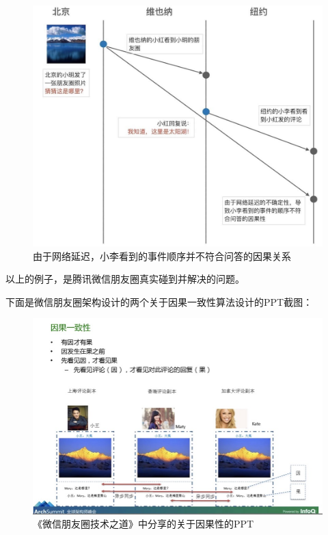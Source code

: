 \documentclass[cn,11pt,chinese]{elegantbook}
\begin{document}
\begin{figure}
\centering
\includegraphics{images/appendix-a-02.jpeg}
\caption{由于网络延迟，小李看到的事件顺序并不符合问答的因果关系}
\end{figure}

以上的例子，是腾讯微信朋友圈真实碰到并解决的问题。

下面是微信朋友圈架构设计的两个关于因果一致性算法设计的PPT截图：

\begin{figure}
\centering
\includegraphics{images/appendix-a-03.jpeg}
\caption{《微信朋友圈技术之道》中分享的关于因果性的PPT}
\end{figure}
\end{document}

